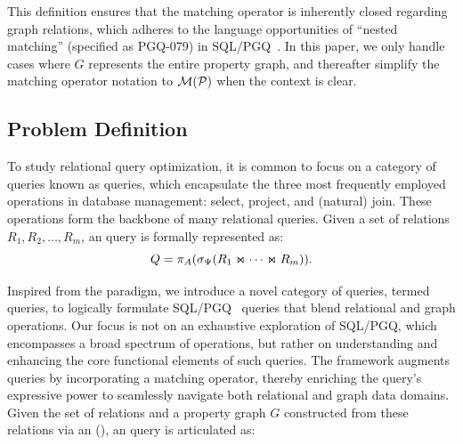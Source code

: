 This definition ensures that the matching operator is inherently closed regarding graph relations,
which adheres to the language opportunities of ``nested matching'' (specified as PGQ-079) in SQL/PGQ~\cite{sql-pgq}.
In this paper, we only handle cases where $G$ represents the entire property graph, and thereafter simplify the matching operator notation to $\mathcal{M}(\mathcal{P})$ when the context is clear.

\subsection{Problem Definition}
\label{sec:problem-definition}

To study relational query optimization, it is common to focus on a category of queries known as \spj queries,
which encapsulate the three most frequently employed operations in database management: select, project, and (natural) join.
These operations form the backbone of many relational queries. Given a set of relations \(R_1, R_2, \ldots, R_m\),
an \spj query is formally represented as:
\[
Q = \pi_A(\sigma_\Psi(R_1 \Join \cdots \Join R_m)).
\]

Inspired from the \spj paradigm, we introduce a novel category of queries, termed \spjm queries, to logically formulate SQL/PGQ~\cite{sql-pgq} queries that
blend relational and graph operations. Our focus is not on an exhaustive exploration of SQL/PGQ, which encompasses a broad spectrum of operations, but rather on understanding and enhancing the core functional elements of such queries.
The \spjm framework augments \spj queries by incorporating a matching operator, thereby enriching the query's expressive power to seamlessly navigate both relational and graph data domains.
Given the set of relations and a property graph \(G\) constructed from these relations via an \rgmapping (),
an \spjm query is articulated as:

